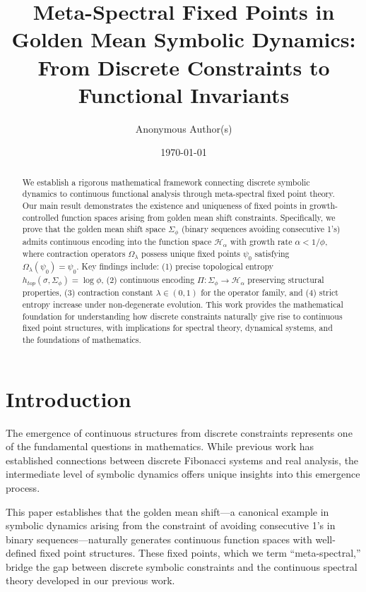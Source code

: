 \documentclass[12pt]{article}
\title{Meta-Spectral Fixed Points in Golden Mean Symbolic Dynamics:\\From Discrete Constraints to Functional Invariants}
\author{Anonymous Author(s)}
\date{\today}
\theoremstyle{plain}
\theoremstyle{definition}
\begin{document}
\maketitle

\begin{abstract}
We establish a rigorous mathematical framework connecting discrete symbolic dynamics to continuous functional analysis through meta-spectral fixed point theory. Our main result demonstrates the existence and uniqueness of fixed points in growth-controlled function spaces arising from golden mean shift constraints. Specifically, we prove that the golden mean shift space $\Sigma_\phi$ (binary sequences avoiding consecutive 1's) admits continuous encoding into the function space $\mathcal{H}_\alpha$ with growth rate $\alpha < 1/\phi$, where contraction operators $\Omega_\lambda$ possess unique fixed points $\psi_0$ satisfying $\Omega_\lambda(\psi_0) = \psi_0$. Key findings include: (1) precise topological entropy $h_{top}(\sigma, \Sigma_\phi) = \log \phi$, (2) continuous encoding $\Pi: \Sigma_\phi \to \mathcal{H}_\alpha$ preserving structural properties, (3) contraction constant $\lambda \in (0,1)$ for the operator family, and (4) strict entropy increase under non-degenerate evolution. This work provides the mathematical foundation for understanding how discrete constraints naturally give rise to continuous fixed point structures, with implications for spectral theory, dynamical systems, and the foundations of mathematics.
\end{abstract}

\section{Introduction}

The emergence of continuous structures from discrete constraints represents one of the fundamental questions in mathematics. While previous work has established connections between discrete Fibonacci systems and real analysis, the intermediate level of symbolic dynamics offers unique insights into this emergence process.

This paper establishes that the golden mean shift—a canonical example in symbolic dynamics arising from the constraint of avoiding consecutive 1's in binary sequences—naturally generates continuous function spaces with well-defined fixed point structures. These fixed points, which we term ``meta-spectral,'' bridge the gap between discrete symbolic constraints and the continuous spectral theory developed in our previous work.
\end{document}
